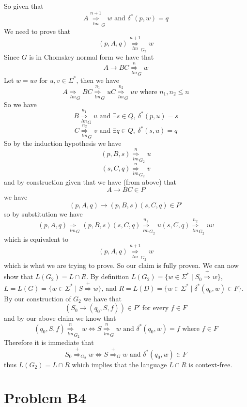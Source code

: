 \documentclass[12pt]{article}
\begin{document}
So given that
$$A \underset{lm}{\overset{n+1}{\Longrightarrow}}_{G} w
\text{ and } \delta^*(p,w) = q$$
We need to prove that
$$(p,A,q) \underset{lm}{\overset{n+1}{\Longrightarrow}}_{G_2} w$$
Since $G$ is in Chomskey normal form we have that
$$A \rightarrow BC \underset{lm}{\overset{n}{\Longrightarrow}}_{G} w$$
Let $w =uv$ for $u,v\in \Sigma^*$, then we have
$$A \underset{lm}{\Longrightarrow}_{G} BC
\underset{lm}{\overset{n_1}{\Longrightarrow}}_{G} uC
\underset{lm}{\overset{n_2}{\Longrightarrow}}_{G} uv
\text{ where } n_1,n_2\le n$$
So we have
$$B \underset{lm}{\overset{n_1}{\Longrightarrow}}_{G} u
\text{ and } \exists s\in Q,\ \delta^*(p,u) = s$$
$$C \underset{lm}{\overset{n_2}{\Longrightarrow}}_{G} v
\text{ and } \exists q\in Q,\ \delta^*(s,u) = q$$
So by the induction hypothesis we have
$$(p,B,s) \underset{lm}{\overset{n}{\Longrightarrow}}_{G_2} u$$
$$(s,C,q) \underset{lm}{\overset{n}{\Longrightarrow}}_{G_2} v$$
and by construction given that we have (from above) that
$$A \rightarrow BC \in P$$
we have
$$(p,A,q) \rightarrow (p,B,s)(s,C,q) \in P'$$
so by substitution we have
$$(p,A,q) \underset{lm}{\Longrightarrow}_{G} (p,B,s)(s,C,q)
\underset{lm}{\overset{n_1}{\Longrightarrow}}_{G_2} u(s,C,q)
\underset{lm}{\overset{n_2}{\Longrightarrow}}_{G_2} uv$$
which is equivalent to
$$(p,A,q) \underset{lm}{\overset{n+1}{\Longrightarrow}}_{G_2} w$$
which is what we are trying to prove. So our claim is fully proven.
We can now show that $L(G_2) = L\cap R$. By definition
$L(G_2) = \{w \in \Sigma^* \mid S_0 \overset{+}{\Longrightarrow} w\}$,
$L = L(G) = \{w \in \Sigma^* \mid S \overset{+}{\Longrightarrow} w\}$, and
$R = L(D) = \{w \in \Sigma^* \mid \delta^*(q_0,w) \in F\}$. By our
construction of $G_2$ we have that
$$(S_0 \rightarrow (q_0,S,f)) \in P' \text{ for every } f \in F$$
and by our above claim we know that
$$(q_0,S,f) \underset{lm}{\overset{n}{\Longrightarrow}}_{G_2} w \iff
S \underset{lm}{\overset{n}{\Longrightarrow}}_{G} w
\text{ and } \delta^*(q_0,w) = f \text{ where } f\in F$$
Therefore it is immediate that
$$ S_0 \overset{+}{\Longrightarrow}_{G_2} w \iff
S \overset{+}{\Longrightarrow}_{G} w \text{ and } \delta^*(q_0,w) \in F$$
thus $L(G_2) = L\cap R$ which implies that the language $L\cap R$ is
context-free.

\section*{Problem B4}
\end{document}
